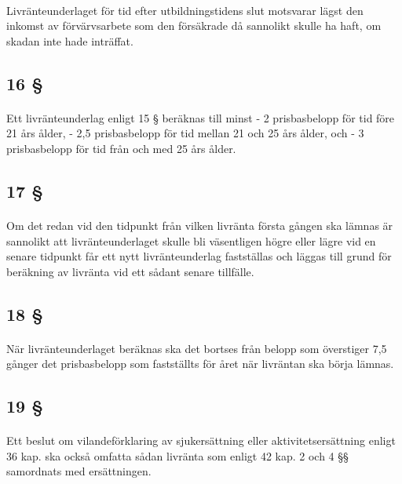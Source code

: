 \documentclass[a4paper,notitlepage,openany,10pt]{book}
\begin{document}
\paragraph*{}
Livränteunderlaget för tid efter utbildningstidens slut motsvarar lägst den inkomst av förvärvsarbete som den försäkrade då sannolikt skulle ha haft, om skadan inte hade inträffat.
\subsection*{16 §}
\paragraph*{}
Ett livränteunderlag enligt 15 § beräknas till minst
\newline - 2 prisbasbelopp för tid före 21 års ålder,
\newline - 2,5 prisbasbelopp för tid mellan 21 och 25 års ålder, och
\newline - 3 prisbasbelopp för tid från och med 25 års ålder.
\subsection*{17 §}
\paragraph*{}
Om det redan vid den tidpunkt från vilken livränta första gången ska lämnas är sannolikt att livränteunderlaget skulle bli väsentligen högre eller lägre vid en senare tidpunkt får ett nytt livränteunderlag fastställas och läggas till grund för beräkning av livränta vid ett sådant senare tillfälle.
\subsection*{18 §}
\paragraph*{}
När livränteunderlaget beräknas ska det bortses från belopp som överstiger 7,5 gånger det prisbasbelopp som fastställts för året när livräntan ska börja lämnas.
\subsection*{19 §}
\paragraph*{}
Ett beslut om vilandeförklaring av sjukersättning eller aktivitetsersättning enligt 36 kap. ska också omfatta sådan livränta som enligt 42 kap. 2 och 4 §§ samordnats med ersättningen.
\end{document}
